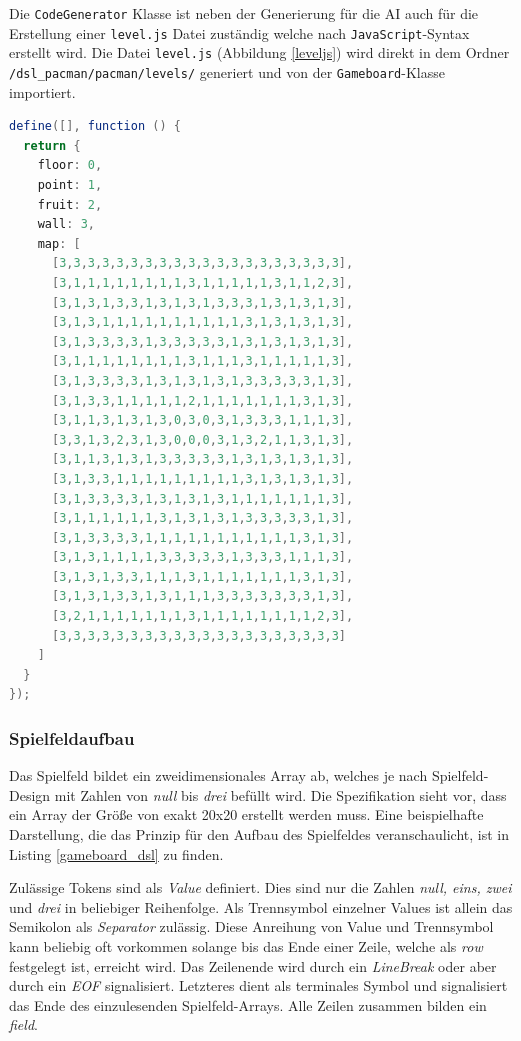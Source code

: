 \documentclass[conference]{IEEEtran}
\begin{document}
Die \texttt{CodeGenerator} Klasse ist neben der Generierung für die AI auch für die Erstellung einer \texttt{level.js} Datei zuständig welche nach \texttt{JavaScript}-Syntax erstellt wird. Die Datei \texttt{level.js} (Abbildung \ref{leveljs})
wird direkt in dem Ordner \texttt{/dsl\_pacman/pacman/levels/} generiert und von der \texttt{Gameboard}-Klasse importiert.

\begin{lstlisting}[language=Java, captionpos=b, caption=Generierte Level Klasse in \emph{JavaScript}, label=leveljs]
define([], function () {
  return {
    floor: 0,
    point: 1,
    fruit: 2,
    wall: 3,
    map: [
      [3,3,3,3,3,3,3,3,3,3,3,3,3,3,3,3,3,3,3,3],
      [3,1,1,1,1,1,1,1,1,3,1,1,1,1,1,3,1,1,2,3],
      [3,1,3,1,3,3,1,3,1,3,1,3,3,3,1,3,1,3,1,3],
      [3,1,3,1,1,1,1,1,1,1,1,1,1,3,1,3,1,3,1,3],
      [3,1,3,3,3,3,1,3,3,3,3,3,1,3,1,3,1,3,1,3],
      [3,1,1,1,1,1,1,1,1,3,1,1,1,3,1,1,1,1,1,3],
      [3,1,3,3,3,3,1,3,1,3,1,3,1,3,3,3,3,3,1,3],
      [3,1,3,3,1,1,1,1,1,2,1,1,1,1,1,1,1,3,1,3],
      [3,1,1,3,1,3,1,3,0,3,0,3,1,3,3,3,1,1,1,3],
      [3,3,1,3,2,3,1,3,0,0,0,3,1,3,2,1,1,3,1,3],
      [3,1,1,3,1,3,1,3,3,3,3,3,1,3,1,3,1,3,1,3],
      [3,1,3,3,1,1,1,1,1,1,1,1,1,3,1,3,1,3,1,3],
      [3,1,3,3,3,3,1,3,1,3,1,3,1,1,1,1,1,1,1,3],
      [3,1,1,1,1,1,1,3,1,3,1,3,1,3,3,3,3,3,1,3],
      [3,1,3,3,3,3,1,1,1,1,1,1,1,1,1,1,1,3,1,3],
      [3,1,3,1,1,1,1,3,3,3,3,3,1,3,3,3,1,1,1,3],
      [3,1,3,1,3,3,1,1,1,3,1,1,1,1,1,1,1,3,1,3],
      [3,1,3,1,3,3,1,3,1,1,1,3,3,3,3,3,3,3,1,3],
      [3,2,1,1,1,1,1,1,1,3,1,1,1,1,1,1,1,1,2,3],
      [3,3,3,3,3,3,3,3,3,3,3,3,3,3,3,3,3,3,3,3]
    ]
  }
});
\end{lstlisting}

\subsubsection{Spielfeldaufbau}
\label{spielfeldaufb}
Das Spielfeld bildet ein zweidimensionales Array ab, welches je nach Spielfeld-Design mit Zahlen von \emph{null} bis \emph{drei} befüllt wird. Die Spezifikation sieht vor, dass ein Array der Größe von exakt 20x20 erstellt werden muss. Eine beispielhafte Darstellung, die das Prinzip für den Aufbau des Spielfeldes veranschaulicht, ist in Listing \ref{gameboard_dsl} zu finden.

Zulässige Tokens sind als \emph{Value} definiert. Dies sind nur die Zahlen \emph{null, eins, zwei} und \emph{drei} in beliebiger Reihenfolge. Als Trennsymbol einzelner Values ist allein das Semikolon als \emph{Separator} zulässig. Diese Anreihung von Value und Trennsymbol kann beliebig oft vorkommen solange bis das Ende einer Zeile, welche als \emph{row} festgelegt ist, erreicht wird. Das Zeilenende wird durch ein \emph{LineBreak} oder aber durch ein \emph{EOF} signalisiert. Letzteres dient als terminales Symbol und signalisiert das Ende des einzulesenden Spielfeld-Arrays. Alle Zeilen zusammen bilden ein \emph{field}.
\end{document}
